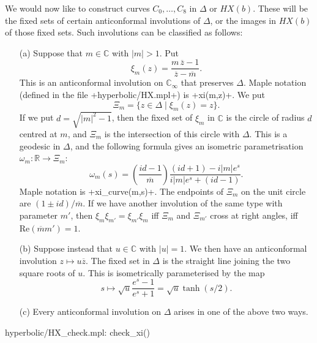 \documentclass[reqno]{amsart}
\newcommand{\Dl}        {\Delta}
\newcommand{\om}        {\omega}
\newcommand{\R}         {{\mathbb{R}}}
\newcommand{\C}         {{\mathbb{C}}}
\newcommand{\ov}[1]     {\overline{#1}}
\newcommand{\st}        {\;|\;}
\renewcommand{\:}{\colon}
\theoremstyle{definition}
\begin{document}
We would now like to construct curves $C_0,\dotsc,C_8$ in $\Dl$ or
$HX(b)$.  These will be the fixed sets of certain anticonformal
involutions of $\Dl$, or the images in $HX(b)$ of those fixed sets.
Such involutions can be classified as follows:
\begin{itemize}
 \item[(a)] Suppose that $m\in\C$ with $|m|>1$.  Put
  \[ \xi_m(z) = \frac{m\,\ov{z}-1}{\ov{z}-\ov{m}}. \]
  This is an anticonformal involution on $\C_\infty$ that preserves
  $\Dl$.  Maple notation (defined in the file \fname+hyperbolic/HX.mpl+) is
  \mcode+xi(m,z)+.  We put
  \[ \Xi_m = \{z\in \Dl \st \xi_m(z)=z\}. \]
  If we put $d=\sqrt{|m|^2-1}$, then the fixed set of $\xi_m$ in $\C$
  is the circle of radius $d$ centred at $m$, and $\Xi_m$ is the
  intersection of this circle with $\Dl$.  This is a geodesic in $\Dl$,
  and the following formula gives an isometric parametrisation
  $\om_m\:\R\to\Xi_m$:
  \[ \om_m(s) =
      \left(\frac{id-1}{\ov{m}}\right)
      \frac{(id+1) - i |m| e^s}{i |m| e^s + (id-1)}.
  \]
  Maple notation is \mcode+xi_curve(m,s)+.
  The endpoints of $\Xi_m$ on the unit circle are
  $(1\pm id)/\ov{m}$.  If we have another involution of the same type
  with parameter $m'$, then $\xi_m\xi_{m'}=\xi_{m'}\xi_m$ iff $\Xi_m$
  and $\Xi_{m'}$ cross at right angles, iff $\text{Re}(\ov{m}m')=1$.
 \item[(b)] Suppose instead that $u\in\C$ with $|u|=1$.  We then have
  an anticonformal involution $z\mapsto u\ov{z}$.  The fixed set in
  $\Dl$ is the straight line joining the two square roots of $u$.  This
  is isometrically parameterised by the map
  \[ s\mapsto \sqrt{u}\frac{e^s - 1}{e^s+1} =
      \sqrt{u}\tanh(s/2).
  \]
 \item[(c)] Every anticonformal involution on $\Dl$ arises in one of the
  above two ways.
\end{itemize}
\begin{checks}
 hyperbolic/HX_check.mpl: check_xi()
\end{checks}
\end{document}
